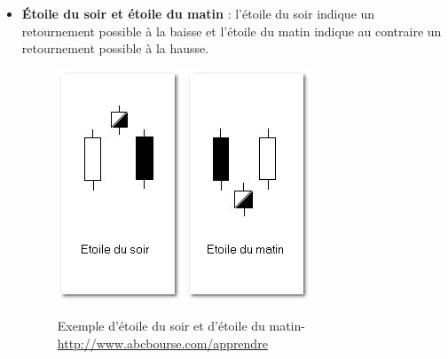 \begin{itemize}
\item \textbf{Étoile du soir et étoile du matin} : l’étoile du soir indique un retournement possible à la baisse et l’étoile du matin indique au contraire un retournement possible à la hausse.
\begin{figure}[H]
  \center
  \includegraphics[scale=0.5]{../graph/chandelier7.png}
  \includegraphics[scale=0.5]{../graph/chandelier8.png}
  \caption{Exemple d'étoile du soir et d'étoile du matin- \url{http://www.abcbourse.com/apprendre}}
\end{figure} 


\end{itemize}

